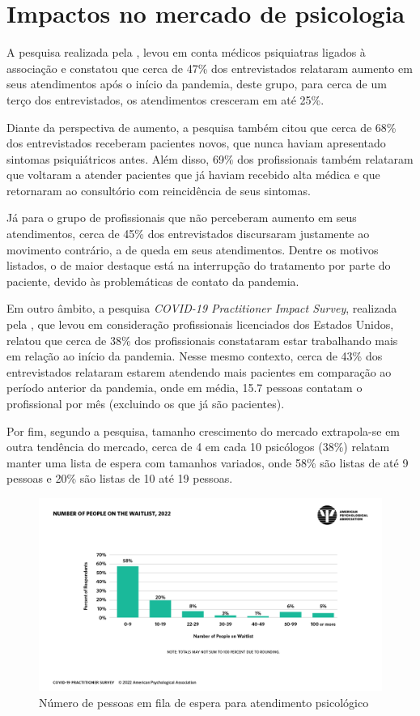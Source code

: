 \section{Impactos no mercado de psicologia}
\label{sec:impactoPsicologia}

A pesquisa realizada pela , levou em conta médicos psiquiatras ligados à associação e constatou que cerca de 47\% dos entrevistados relataram aumento em seus atendimentos após o início da pandemia, deste grupo, para cerca de um terço dos entrevistados, os atendimentos cresceram em até 25\%.

Diante da perspectiva de aumento, a pesquisa também citou que cerca de 68\% dos entrevistados receberam pacientes novos, que nunca haviam apresentado sintomas psiquiátricos antes. Além disso, 69\% dos profissionais também relataram que voltaram a atender pacientes que já haviam recebido alta médica e que retornaram ao consultório com reincidência de seus sintomas.

Já para o grupo de profissionais que não perceberam aumento em seus atendimentos, cerca de 45\% dos entrevistados discursaram justamente ao movimento contrário, a de queda em seus atendimentos. Dentre os motivos listados, o de maior destaque está na interrupção do tratamento por parte do paciente, devido às problemáticas de contato da pandemia.

Em outro âmbito, a pesquisa \textit{COVID-19 Practitioner Impact Survey}, realizada pela , que levou em consideração profissionais licenciados dos Estados Unidos, relatou que cerca de 38\% dos profissionais constataram estar trabalhando mais em relação ao início da pandemia. Nesse mesmo contexto, cerca de 43\% dos entrevistados relataram estarem atendendo mais pacientes em comparação ao período anterior da pandemia, onde em média, 15.7 pessoas contatam o profissional por mês (excluindo os que já são pacientes).

Por fim, segundo a pesquisa, tamanho crescimento do mercado extrapola-se em outra tendência do mercado, cerca de 4 em cada 10 psicólogos (38\%) relatam manter uma lista de espera com tamanhos variados, onde 58\% são listas de até 9 pessoas e 20\% são listas de 10 até 19 pessoas.

\begin{figure}[H]
    \centering
    \caption{Número de pessoas em fila de espera para atendimento psicológico}
    \label{fig:listaDeEspera}
    \includegraphics[width=.9\textwidth]{data/figures/lista-de-espera-psicologia.png}
\end{figure}
